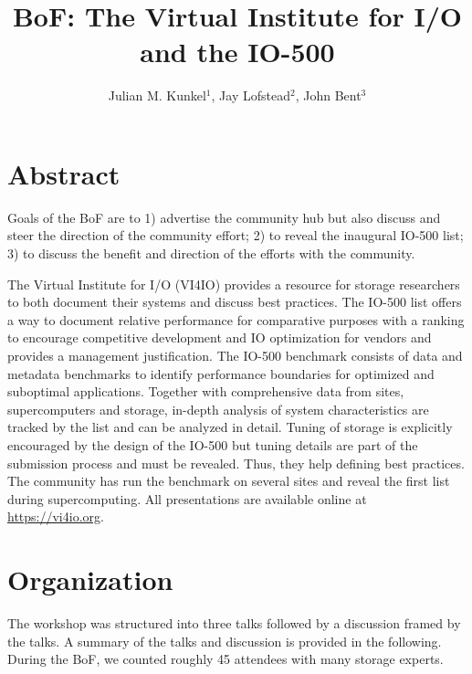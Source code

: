 \documentclass{llncs}
\begin{document}
\mainmatter


\author{Julian M. Kunkel$^1$, Jay Lofstead$^2$, John Bent$^3$}

\title{BoF: The Virtual Institute for I/O and the IO-500}


\maketitle{}

\section{Abstract}

Goals of the BoF are to 1) advertise the community hub but also discuss and steer the direction of the community effort; 2) to reveal the inaugural IO-500 list; 3) to discuss the benefit and direction of the efforts with the community.

The Virtual Institute for I/O (VI4IO) provides a resource for storage researchers to both document their systems and discuss best practices. The IO-500 list offers a way to document relative performance for comparative purposes with a ranking to encourage competitive development and IO optimization for vendors and provides a management justification. The IO-500 benchmark consists of data and metadata benchmarks to identify performance boundaries for optimized and suboptimal applications. Together with comprehensive data from sites, supercomputers and storage, in-depth analysis of system characteristics are tracked by the list and can be analyzed in detail. Tuning of storage is explicitly encouraged by the design of the IO-500 but tuning details are part of the submission process and must be revealed. Thus, they help defining best practices.
The community has run the benchmark on several sites and reveal the first list during supercomputing.
All presentations are available online at \url{https://vi4io.org}.

\section{Organization}

The workshop was structured into three talks followed by a discussion framed by the talks.
A summary of the talks and discussion is provided in the following.
During the BoF, we counted roughly 45 attendees with many storage experts.
\end{document}
